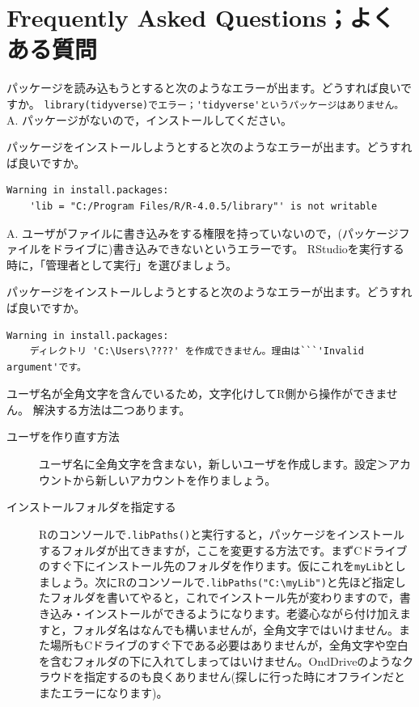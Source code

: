 \documentclass{ltjsbook}
\begin{document}
 
\VerbatimFootnotes
\chapter{Frequently Asked Questions；よくある質問}

\begin{FAQ}{パッケージを読み込もうとすると次のようなエラーが出ます。どうすれば良いですか。}{}
    \verb|library(tidyverse)でエラー；'tidyverse'というパッケージはありません。|
    \tcblower
    {\large A.} パッケージがないので，インストールしてください。
\end{FAQ}


\begin{FAQ}{パッケージをインストールしようとすると次のようなエラーが出ます。どうすれば良いですか。}{}
\begin{verbatim}
Warning in install.packages:
    'lib = "C:/Program Files/R/R-4.0.5/library"' is not writable
\end{verbatim}
\tcblower
{\large A.} ユーザがファイルに書き込みをする権限を持っていないので，(パッケージファイルをドライブに)書き込みできないというエラーです。
RStudioを実行する時に，「管理者として実行」を選びましょう。
\end{FAQ}


\begin{FAQ}{パッケージをインストールしようとすると次のようなエラーが出ます。どうすれば良いですか。}{}
\begin{verbatim}
Warning in install.packages:
    ディレクトリ 'C:\Users\????' を作成できません。理由は```'Invalid argument'です。
\end{verbatim}
ユーザ名が全角文字を含んでいるため，文字化けしてR側から操作ができません。
解決する方法は二つあります。
\begin{description}
    \item [ユーザを作り直す方法] ユーザ名に全角文字を含まない，新しいユーザを作成します。設定＞アカウントから新しいアカウントを作りましょう。
    \item [インストールフォルダを指定する] Rのコンソールで\verb|.libPaths()|と実行すると，パッケージをインストールするフォルダが出てきますが，ここを変更する方法です。まずCドライブのすぐ下にインストール先のフォルダを作ります。仮にこれを\verb|myLib|としましょう。次にRのコンソールで\verb|.libPaths("C:\myLib")|と先ほど指定したフォルダを書いてやると，これでインストール先が変わりますので，書き込み・インストールができるようになります。老婆心ながら付け加えますと，フォルダ名はなんでも構いませんが，全角文字ではいけません。また場所もCドライブのすぐ下である必要はありませんが，全角文字や空白を含むフォルダの下に入れてしまってはいけません。OndDriveのようなクラウドを指定するのも良くありません(探しに行った時にオフラインだとまたエラーになります)。
\end{description}
\end{FAQ}
\end{document}
